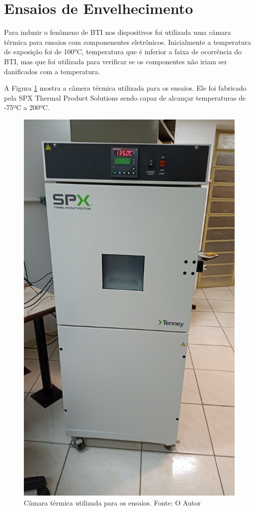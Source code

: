 \section{Ensaios de Envelhecimento}
\label{sec:MetEnsaios}

Para induzir o fenômeno de BTI nos dispositivos foi utilizada uma câmara térmica para ensaios com componenentes eletrônicos. Inicialmente a temperatura de exposição foi de 100°C, temperatura que é inferior a faixa de ocorrência do BTI, mas que foi utilizada para verificar se os componentes não iriam ser danificados com a temperatura.

A Figura \ref{fig:CamTerm} mostra a câmera térmica utilizada para os ensaios. Ele foi fabricado pela SPX Thermal Product Solutions sendo capaz de alcançar temperaturas de -75ºC a 200ºC.

\begin{figure}[H]
    \centering
    \includegraphics[angle=270, scale=0.08]{figures/Metodologia/Ensaios_CamaraTermica.jpg}
    \caption{Câmara térmica utilizada para os ensaios. Fonte: O Autor}
    \label{fig:CamTerm}
\end{figure}

